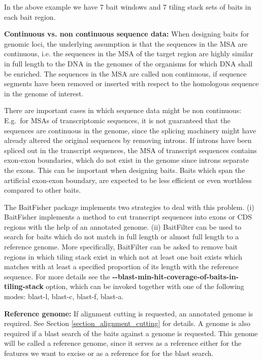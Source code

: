 \documentclass[a4paper,pdflatex,11pt]{article}
\begin{document}
In the above example we have 7 bait windows and 7 tiling stack sets
of baits in each bait region.


\textbf{Continuous vs. non continuous sequence data:}
When designing baits for genomic loci, the underlying assumption is that
the sequences in the MSA are continuous, i.e.
the sequences in the MSA of the target region are highly similar in full length to the DNA
in the genomes of the organisms for which DNA shall be enriched.
The sequences in the MSA are called non continuous, if sequence segments have been removed
or inserted with respect to the homologous sequence in the genome of interest.

There are important cases in which sequence data might be non continuous:
E.g.\ for MSAs of transcriptomic sequences, it is not guaranteed that
the sequences are continuous in the genome, since the splicing machinery might have
already altered the original sequences by removing introns.
If introns have been spliced out in the transcript sequences,
the MSA of transcript sequences contains exon-exon boundaries, which do not
exist in the genome since introns separate the exons.
This can be important when designing baits. Baits which span the artificial exon-exon boundary,
are expected to be less efficient or even worthless compared to other baits.


The BaitFisher package implements two strategies to deal with this problem.
(i) BaitFisher implements a method to cut transcript sequences into exons or CDS regions
with the help of an annotated genome.
(ii) BaitFilter can be used to search for baits which do not match in full length or almost full length
to a reference genome.
More specifically, BaitFilter can be asked to remove bait regions
in which tiling stack exist in which not at least one bait exists which
matches with at least a specified proportion of its length with the reference sequence. For more details see the
\textbf{-\/-blast-min-hit-coverage-of-baits-in-tiling-stack} option, which can be invoked together with one of the following modes:
blast-l, blast-c, blast-f, blast-a.


\textbf{Reference genome:}
If alignment cutting is requested, an annotated genome is required. See
Section \ref{section_alignment_cutting} for details. A genome is also required if a blast search of the baits against a genome is requested.
This genome will be called a reference genome, since it serves as a reference either for the features we want to excise or as a reference for
for the blast search.
\end{document}
